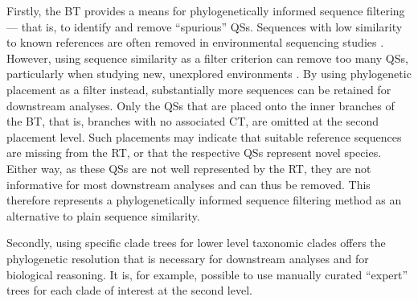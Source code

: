 Firstly, the \ac{BT} provides a means for phylogenetically informed sequence filtering---%
that is, to identify and remove ``spurious'' \acp{QS}.
Sequences with low similarity to known references are often removed in environmental sequencing studies \cite{Stoeck2010}.
However, using sequence similarity as a filter criterion can remove too many \acp{QS},
particularly when studying new, unexplored environments \cite{Mahe2017}.
By using phylogenetic placement as a filter instead, substantially more sequences can be retained for downstream analyses.
Only the \acp{QS} that are placed onto the inner branches of the \ac{BT},
that is, branches with no associated \ac{CT},
are omitted at the second placement level.
Such placements may indicate that suitable reference sequences are missing from the \ac{RT},
or that the respective \acp{QS} represent novel species.
Either way, as these \acp{QS} are not well represented by the \ac{RT},
they are not informative for most downstream analyses and can thus be removed.
This therefore represents a phylogenetically informed sequence filtering method
as an alternative to plain sequence similarity.

Secondly, using specific clade trees for lower level taxonomic clades offers the phylogenetic resolution
that is necessary for downstream analyses and for biological reasoning.
It is, for example, possible to use manually curated ``expert'' trees for each clade of interest
at the second level.

